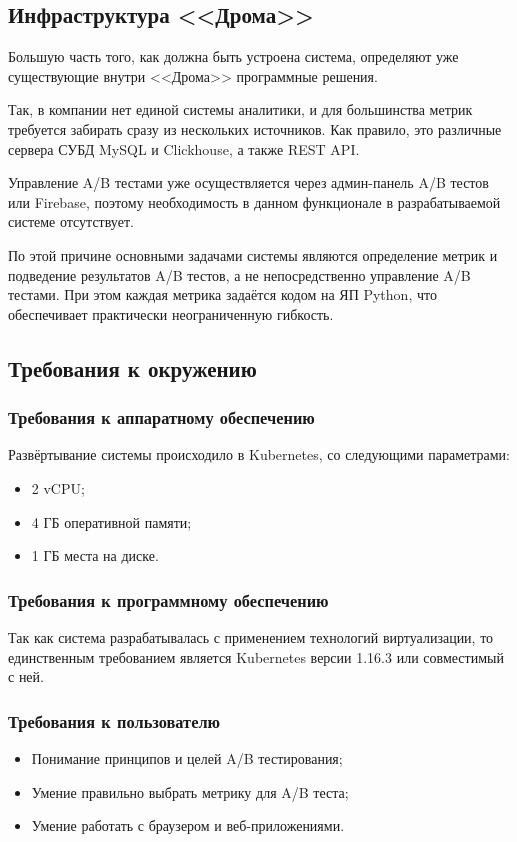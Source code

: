 \documentclass[../document.tex]{subfiles}
\begin{document}
	\subsection{Инфраструктура <<Дрома>>}
	\par Большую часть того, как должна быть устроена система, определяют уже существующие внутри <<Дрома>> программные решения.
	\par Так, в компании нет единой системы аналитики, и для большинства метрик требуется забирать сразу из нескольких источников. Как правило, это различные сервера СУБД MySQL и Clickhouse, а также REST API.
	\par Управление A/B тестами уже осуществляется через админ-панель A/B тестов или Firebase, поэтому необходимость в данном функционале в разрабатываемой системе отсутствует.
	\par По этой причине основными задачами системы являются определение метрик и подведение результатов A/B тестов, а не непосредственно управление A/B тестами. При этом каждая метрика задаётся кодом на ЯП Python, что обеспечивает практически неограниченную гибкость.
	\subsection{Требования к окружению}
	\subsubsection{Требования к аппаратному обеспечению}
	\par Развёртывание системы происходило в Kubernetes, со следующими параметрами:
	\begin{itemize}
		\item 2 vCPU;
		\item 4 ГБ оперативной памяти;
		\item 1 ГБ места на диске.
	\end{itemize}
	\subsubsection{Требования к программному обеспечению}
	\par Так как система разрабатывалась с применением технологий виртуализации, то единственным требованием является Kubernetes версии 1.16.3 или совместимый с ней.
	\subsubsection{Требования к пользователю}
	\begin{itemize}
		\item Понимание принципов и целей A/B тестирования;
		\item Умение правильно выбрать метрику для A/B теста;
		\item Умение работать с браузером и веб-приложениями.
	\end{itemize}
\end{document}
